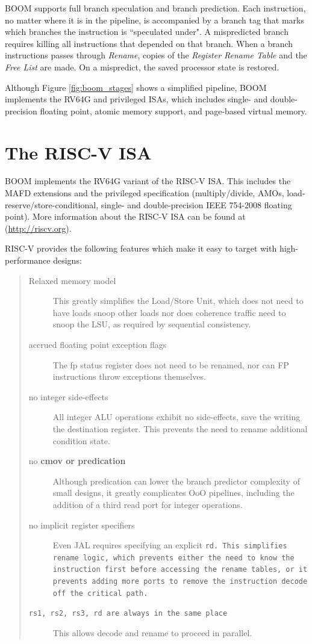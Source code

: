   
BOOM supports full branch speculation and branch prediction.  Each instruction, no matter where it is in the pipeline,  is accompanied by a branch tag that marks which branches the instruction is ``speculated under". A mispredicted branch requires killing all instructions that depended on that branch.  When a branch instructions passes through {\em Rename}, copies of the {\em Register Rename Table} and the {\em Free List} are made.  On a mispredict, the saved processor state is restored.

Although Figure \ref{fig:boom_stages} shows a simplified pipeline, BOOM implements the RV64G and privileged ISAs, which includes single- and double-precision floating point, atomic memory support, and page-based virtual memory. 



\section{The RISC-V ISA}

BOOM implements the RV64G variant of the RISC-V ISA. This includes the MAFD
extensions and the privileged specification (multiply/divide, AMOs,
load-reserve/store-conditional, single- and double-precision IEEE
754-2008 floating point). More information about the RISC-V
ISA can be found at (\url{http://riscv.org}).

RISC-V provides the following features which make it easy to target with high-performance designs:

\begin{quote}
\begin{description}
\item [Relaxed memory model] This greatly simplifies the Load/Store Unit, which does not need to have loads snoop other loads nor does coherence traffic need to snoop the LSU, as required by sequential consistency.
\item [accrued floating point exception flags] The fp status register does not need to be renamed, nor can FP instructions throw exceptions themselves. 
\item [no integer side-effects] All integer ALU operations exhibit no side-effects, save the writing the destination register. This prevents the need to rename additional condition state.
\item [no \bf{cmov} or predication] Although predication can lower the branch predictor complexity of small designs, it greatly complicates OoO pipelines, including the addition of a third read port for integer operations.
\item [no implicit register specifiers] Even JAL requires specifying an explicit \tt{rd}. This simplifies rename logic, which prevents either the need to know the instruction first before accessing the rename tables, or it prevents adding more ports to remove the instruction decode off the critical path.
\item [\tt{rs1}, \tt{rs2}, \tt{rs3}, \tt{rd} are always in the same place] This allows decode and rename to proceed in parallel. 

\end{description}
\end{quote}

